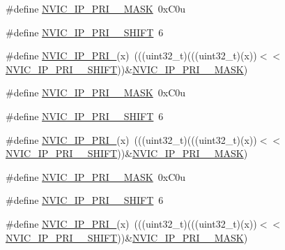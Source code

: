 \begin{DoxyCompactItemize}
\item 
\#define \hyperlink{group___n_v_i_c___register___masks_gaf800b7cfd31d334c41925283abeeaeb6}{N\+V\+I\+C\+\_\+\+I\+P\+\_\+\+P\+R\+I\+\_\+\_\+\+M\+A\+SK}~0x\+C0u
\item 
\#define \hyperlink{group___n_v_i_c___register___masks_ga82be7fed090f8f1ab5a01f2fdfd334b4}{N\+V\+I\+C\+\_\+\+I\+P\+\_\+\+P\+R\+I\+\_\+\_\+\+S\+H\+I\+FT}~6
\item 
\#define \hyperlink{group___n_v_i_c___register___masks_ga7419dc7b30b23246e46a5939a998a620}{N\+V\+I\+C\+\_\+\+I\+P\+\_\+\+P\+R\+I\+\_}(x)~(((uint32\+\_\+t)(((uint32\+\_\+t)(x))$<$$<$\hyperlink{group___n_v_i_c___register___masks_ga82be7fed090f8f1ab5a01f2fdfd334b4}{N\+V\+I\+C\+\_\+\+I\+P\+\_\+\+P\+R\+I\+\_\+\_\+\+S\+H\+I\+FT}))\&\hyperlink{group___n_v_i_c___register___masks_gaf800b7cfd31d334c41925283abeeaeb6}{N\+V\+I\+C\+\_\+\+I\+P\+\_\+\+P\+R\+I\+\_\+\_\+\+M\+A\+SK})
\item 
\#define \hyperlink{group___n_v_i_c___register___masks_ga98b67c16495a2086981414f7be52c196}{N\+V\+I\+C\+\_\+\+I\+P\+\_\+\+P\+R\+I\+\_\+\_\+\+M\+A\+SK}~0x\+C0u
\item 
\#define \hyperlink{group___n_v_i_c___register___masks_ga5ec9fa6126f0d654ba4ca6268f010360}{N\+V\+I\+C\+\_\+\+I\+P\+\_\+\+P\+R\+I\+\_\+\_\+\+S\+H\+I\+FT}~6
\item 
\#define \hyperlink{group___n_v_i_c___register___masks_gab28da0ede0bca31facd4980e046ca321}{N\+V\+I\+C\+\_\+\+I\+P\+\_\+\+P\+R\+I\+\_}(x)~(((uint32\+\_\+t)(((uint32\+\_\+t)(x))$<$$<$\hyperlink{group___n_v_i_c___register___masks_ga5ec9fa6126f0d654ba4ca6268f010360}{N\+V\+I\+C\+\_\+\+I\+P\+\_\+\+P\+R\+I\+\_\+\_\+\+S\+H\+I\+FT}))\&\hyperlink{group___n_v_i_c___register___masks_ga98b67c16495a2086981414f7be52c196}{N\+V\+I\+C\+\_\+\+I\+P\+\_\+\+P\+R\+I\+\_\+\_\+\+M\+A\+SK})
\item 
\#define \hyperlink{group___n_v_i_c___register___masks_gad9d53a724bb3444439b236ad42d98266}{N\+V\+I\+C\+\_\+\+I\+P\+\_\+\+P\+R\+I\+\_\+\_\+\+M\+A\+SK}~0x\+C0u
\item 
\#define \hyperlink{group___n_v_i_c___register___masks_ga06c5d2803f46b7145c7369ad34ce864b}{N\+V\+I\+C\+\_\+\+I\+P\+\_\+\+P\+R\+I\+\_\+\_\+\+S\+H\+I\+FT}~6
\item 
\#define \hyperlink{group___n_v_i_c___register___masks_ga22846942dac231dd77494429e526f25a}{N\+V\+I\+C\+\_\+\+I\+P\+\_\+\+P\+R\+I\+\_}(x)~(((uint32\+\_\+t)(((uint32\+\_\+t)(x))$<$$<$\hyperlink{group___n_v_i_c___register___masks_ga06c5d2803f46b7145c7369ad34ce864b}{N\+V\+I\+C\+\_\+\+I\+P\+\_\+\+P\+R\+I\+\_\+\_\+\+S\+H\+I\+FT}))\&\hyperlink{group___n_v_i_c___register___masks_gad9d53a724bb3444439b236ad42d98266}{N\+V\+I\+C\+\_\+\+I\+P\+\_\+\+P\+R\+I\+\_\+\_\+\+M\+A\+SK})
$$
\end{DoxyCompactItemize}
